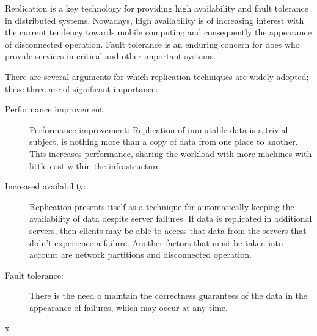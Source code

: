 Replication is a key technology for providing high availability and fault tolerance in distributed systems. Nowadays, high availability is of increasing interest with the current tendency towards mobile computing and consequently the appearance of disconnected operation. Fault tolerance is an enduring concern for does who provide services in critical and other important systems.

There are several arguments for which replication techniques are widely adopted; these three are of significant importance:

\begin{description}
	\item [Performance improvement:] Performance improvement: Replication of immutable data is a trivial subject, is nothing more than a copy of data from one place to another. This increases performance, sharing the workload with more machines with little cost within the infrastructure.
	\item [Increased availability:] Replication presents itself as a technique for automatically keeping the availability of data despite server failures. If data is replicated in additional servers, then clients may be able to access that data from the servers that didn't experience a failure.
		Another factors that must be taken into account are network partitions and disconnected operation.
	\item [Fault tolerance:] There is the need o maintain the correctness guarantees of the data in the appearance of failures, which may occur at any time.
\end{description}
x





 
